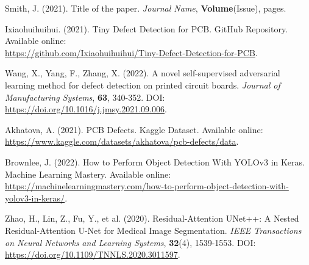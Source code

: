 \documentclass[12pt]{article}
\begin{document}
\begin{thebibliography}{10} 
    Smith, J. (2021). Title of the paper. \textit{Journal Name}, \textbf{Volume}(Issue), pages.
    
    Ixiaohuihuihui. (2021). Tiny Defect Detection for PCB. GitHub Repository. Available online: \\\url{https://github.com/Ixiaohuihuihui/Tiny-Defect-Detection-for-PCB}.
    
    Wang, X., Yang, F., Zhang, X. (2022). A novel self-supervised adversarial learning method for defect detection on printed circuit boards. \textit{Journal of Manufacturing Systems}, \textbf{63}, 340-352. DOI: \url{https://doi.org/10.1016/j.jmsy.2021.09.006}.
    
    Akhatova, A. (2021). PCB Defects. Kaggle Dataset. Available online: \url{https://www.kaggle.com/datasets/akhatova/pcb-defects/data}.
    
    Brownlee, J. (2022). How to Perform Object Detection With YOLOv3 in Keras. Machine Learning Mastery. Available online: \url{https://machinelearningmastery.com/how-to-perform-object-detection-with-yolov3-in-keras/}.
    
    Zhao, H., Lin, Z., Fu, Y., et al. (2020). Residual-Attention UNet++: A Nested Residual-Attention U-Net for Medical Image Segmentation. \textit{IEEE Transactions on Neural Networks and Learning Systems}, \textbf{32}(4), 1539-1553. DOI: \url{https://doi.org/10.1109/TNNLS.2020.3011597}.
    
\end{thebibliography}

\clearpage
\newpage
\end{document}
